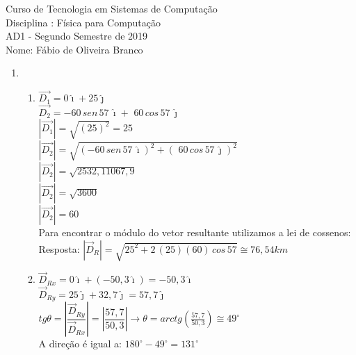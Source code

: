 \documentclass[a4paper, 12pt]{article}
\begin{document}
\begin{center}
Curso de Tecnologia em Sistemas de Computação \\
Disciplina : Física para Computação \\
AD1 - Segundo Semestre de 2019 \\
Nome: Fábio de Oliveira Branco\\ 
\end{center} 


\begin{enumerate}
\item \begin{enumerate}
	\item 
	 $\vec{D_1} = 0\hat{\imath} + 25\hat{\jmath}$ \\
	
	$\vec{D_2} = -60 \, sen\,57\,\hat{\imath} + \,\,60 \, cos\,57\,\hat{\jmath}$ \\
	
	$|\vec{D_1}| = \sqrt{(25)^2} = 25$ \\
	
	$|\vec{D_2}| = \sqrt{(-60 \, sen\,57\,\hat{\imath})^2 + ( \,\,60 \, cos\,57\,\hat{\jmath})^2}$ \\
	
	$|\vec{D_2}| = \sqrt{2532,1 1067,9}$ \\
	
	$|\vec{D_2}| = \sqrt{3600}$ \\
	
	$|\vec{D_2}| = 60$ \\
	
	Para encontrar o módulo do vetor resultante utilizamos a lei de cossenos: \\ 
	
	 Resposta: $|\vec{D}_R| = \sqrt{25^2 + 2\,(25)(60)\, cos\,57} \cong 76,54km$\\
	
	\item $\vec{D}_{Rx} = 0 \hat{\imath} + (-50,3 \hat{\imath}) = -50,3 \hat{\imath}$ \\
	
	$\vec{D}_{Ry} = 25\hat{\jmath} + 32,7\hat{\jmath} = 57,7\hat{\jmath} $ \\
	
	$tg\theta = |\dfrac{\vec{D}_{Ry}}{\vec{D}_{Rx}}| = |\dfrac{57,7}{50,3}| \rightarrow \theta = arctg(\frac{57,7}{50,3}) \cong 49^{\circ}$ \\
	
A direção é igual a: $180^{\circ} - 49^{\circ} =  131^{\circ}$ \\


\end{enumerate}
\end{enumerate}
\end{document}
